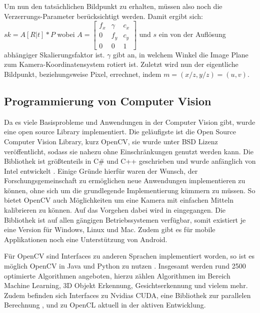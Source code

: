 Um nun den tatsächlichen Bildpunkt zu erhalten, müssen also noch die Verzerrungs-Parameter berücksichtigt werden. Damit ergibt sich:
$sk = A [R | t] * P 
$
wobei $A = \begin{bmatrix} f_x & \gamma & c_x \\
                             0 &  f_y   & c_y \\
                             0 &  0     &  1\end{bmatrix}$ und $s$ ein von der Auflösung abhängiger Skalierungsfaktor ist. $\gamma$ gibt an, in welchem Winkel die Image Plane zum Kamera-Koordinatensystem rotiert ist. Zuletzt wird nun der eigentliche Bildpunkt, beziehungsweise Pixel, errechnet, indem $m=(x/z, y/z)=(u,v)$.



\subsection{Programmierung von Computer Vision}
\label{sec:opencv}
Da es viele Basisprobleme und Anwendungen in der Computer Vision gibt, wurde eine open source Library implementiert. Die geläufigste ist die Open Source Computer Vision Library, kurz OpenCV, sie wurde unter BSD Lizenz veröffentlicht, sodass sie nahezu ohne Einschränkungen genutzt werden kann. Die Bibliothek ist größtenteils in C\# und C++  geschrieben und wurde anfänglich von Intel entwickelt \textbf{\autocite[512--]{Medioni:2004:ETC:993884}}. Einige Gründe hierfür waren der Wunsch, der Forschungsgemeinschaft zu ermöglichen neue Anwendungen implementieren zu können, ohne sich um die grundlegende Implementierung kümmern zu müssen. So bietet OpenCV auch Möglichkeiten um eine Kamera mit einfachen Mitteln kalibrieren zu können. Auf das Vorgehen dabei wird in  eingegangen.
Die Bibliothek ist auf allen gängigen Betriebssystemen verfügbar, somit existiert je eine Version für Windows, Linux und Mac. Zudem gibt es für mobile Applikationen noch eine Unterstützung von Android.

Für OpenCV sind Interfaces zu anderen Sprachen implementiert worden, so ist es möglich OpenCV in Java und Python zu nutzen \autocite{OpenCV2016}. Insgesamt werden rund 2500 optimierte Algorithmen angeboten, hierzu zählen Algorithmen im Bereich Machine Learning, 3D Objekt Erkennung, Gesichtserkennung und vielem mehr. Zudem befinden sich Interfaces zu Nvidias CUDA, eine Bibliothek zur parallelen Berechnung \autocite{cuda2017}, und zu OpenCL aktuell in der aktiven Entwicklung.




